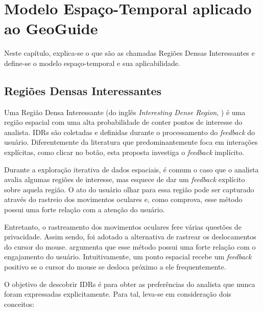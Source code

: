 \chapter{Modelo Espaço-Temporal aplicado ao GeoGuide}
\label{chap:modelo}



Neste capítulo, explica-se o que são as chamadas Regiões Densas Interessantes e define-se o modelo espaço-temporal e sua aplicabilidade.

\section{Regiões Densas Interessantes}

Uma Região Densa Interessante (do inglês {\em Interesting Dense Region}, ) é uma região espacial com uma alta probabilidade de conter pontos de interesse do analista. IDRs são coletadas e definidas durante o processamento do {\em feedback} do usuário. Diferentemente da literatura que predominantemente foca em interações explícitas, como clicar no botão, esta proposta investiga o {\em feedback} implícito.

Durante a exploração iterativa de dados espaciais, é comum o caso que o analista avalia algumas regiões de interesse, mas esquece de dar um {\em feedback} explícito sobre aquela região. O ato do usuário olhar para essa região pode ser capturado através do rastreio dos movimentos oculares e, como  comprova, esse método possui uma forte relação com a atenção do usuário.

Entretanto, o rastreamento dos movimentos oculares fere várias questões de privacidade. Assim sendo, foi adotado a alternativa de rastrear os deslocamentos do cursor do mouse.  argumenta que esse método possui uma forte relação com o engajamento do usuário. Intuitivamente, um ponto espacial recebe um {\em feedback} positivo se o cursor do mouse se desloca próximo a ele frequentemente.

O objetivo de descobrir IDRs é para obter as preferências do analista que nunca foram expressadas explicitamente. Para tal, leva-se em consideração dois conceitos:

